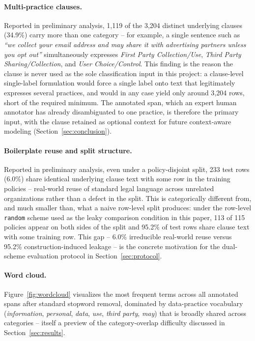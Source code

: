 \documentclass[11pt]{acl}
\begin{document}
\paragraph{Multi-practice clauses.} Reported in preliminary analysis, 1{,}119 of the
3{,}204 distinct underlying clauses (34.9\%) carry more than one category -- for
example, a single sentence such as \emph{``we collect your email address and may share
it with advertising partners unless you opt out''} simultaneously expresses \emph{First
Party Collection/Use}, \emph{Third Party Sharing/Collection}, and \emph{User
Choice/Control}. This finding is the reason the clause is never used as the sole
classification input in this project: a clause-level single-label formulation would
force a single label onto text that legitimately expresses several practices, and would
in any case yield only around 3{,}204 rows, short of the required minimum. The
annotated span, which an expert human annotator has already disambiguated to one
practice, is therefore the primary input, with the clause retained as optional context
for future context-aware modeling (Section~\ref{sec:conclusion}).

\paragraph{Boilerplate reuse and split structure.} Reported in preliminary analysis, even
under a policy-disjoint split, 233 test rows (6.0\%) share identical underlying clause
text with some row in the training policies -- real-world reuse of standard legal
language across unrelated organizations rather than a defect in the split. This is
categorically different from, and much smaller than, what a naive row-level split
produces: under the row-level \texttt{random} scheme used as the leaky comparison
condition in this paper, 113 of 115 policies appear on both sides of the split and
95.2\% of test rows share clause text with some training row. This gap -- 6.0\%
irreducible real-world reuse versus 95.2\% construction-induced leakage -- is the
concrete motivation for the dual-scheme evaluation protocol in
Section~\ref{sec:protocol}.

\paragraph{Word cloud.} Figure~\ref{fig:wordcloud} visualizes the most frequent terms
across all annotated spans after standard stopword removal, dominated by data-practice
vocabulary (\emph{information}, \emph{personal}, \emph{data}, \emph{use}, \emph{third
party}, \emph{may}) that is broadly shared across categories -- itself a preview of the
category-overlap difficulty discussed in Section~\ref{sec:results}.
\end{document}

